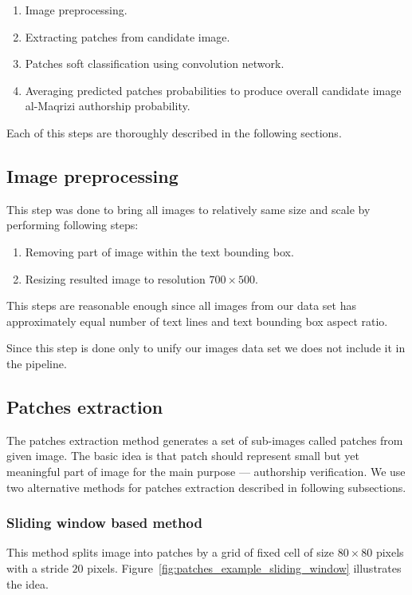 \documentclass[conference,a4paper,twocolumn]{IEEEtran}
\newcommand{\convnet}{ConvNet~} %
\begin{document}
\begin{enumerate}[start=0]
	\item Image preprocessing.
	\item Extracting patches from candidate image.
	\item Patches soft classification using convolution network.
	\item Averaging predicted patches probabilities to produce overall candidate image al-Maqrizi authorship probability.
\end{enumerate}

Each of this steps are thoroughly described in the following sections.	



\subsection{Image preprocessing}
This step was done to bring all images to relatively same size and scale by performing following steps:
\begin{enumerate}
	\item Removing part of image within the text bounding box.
	\item Resizing resulted image to resolution $700\times 500$.
\end{enumerate}
This steps are reasonable enough since all images from our data set has approximately equal number of text lines and text bounding box aspect ratio. 

Since this step is done only to unify our images data set we does not include it in the pipeline.

\subsection{Patches extraction}
The patches extraction method generates a set of sub-images called patches from given image. The basic idea is that patch should represent small but yet meaningful part of image for the main purpose --- authorship verification. We use two alternative methods for patches extraction described in following subsections.

\subsubsection{Sliding window based method}
This method splits image into patches by a grid of fixed cell of size $80\times 80$ pixels with a stride $20$ pixels. Figure~\ref{fig:patches_example_sliding_window} illustrates the idea. 
\end{document}
